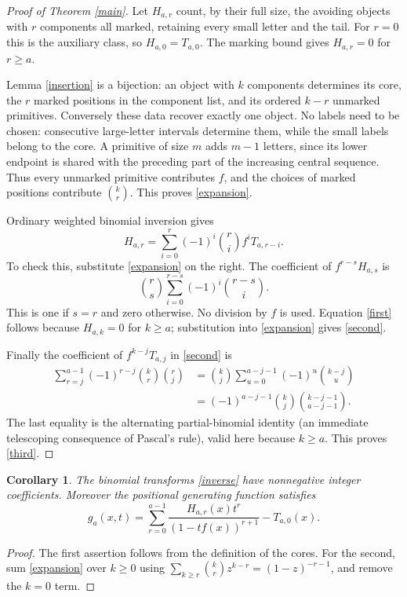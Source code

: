 \documentclass[11pt]{article}
\newtheorem{corollary}{Corollary}
\begin{document}
\begin{proof}[Proof of Theorem \ref{main}]
Let $H_{a,r}$ count, by their full size, the avoiding objects with
$r$ components all marked, retaining every small letter and the
tail. For $r=0$ this is the auxiliary class, so $H_{a,0}=T_{a,0}$.
The marking bound gives $H_{a,r}=0$ for $r\ge a$.

Lemma \ref{insertion} is a bijection: an object with $k$ components
determines its core, the $r$ marked positions in the component
list, and its ordered $k-r$ unmarked primitives. Conversely these
data recover exactly one object. No labels need to be chosen:
consecutive large-letter intervals determine them, while the
small labels belong to the core. A primitive of size $m$ adds
$m-1$ letters, since its lower endpoint is shared with the
preceding part of the increasing central sequence. Thus every
unmarked primitive contributes $f$, and the choices of marked
positions contribute $\binom{k}{r}$. This proves \eqref{expansion}.

Ordinary weighted binomial inversion gives
\begin{equation}\label{inverse}
 H_{a,r}=\sum_{i=0}^r(-1)^i\binom{r}{i}f^iT_{a,r-i}.
\end{equation}
To check this, substitute \eqref{expansion} on the right.
The coefficient of $f^{r-s}H_{a,s}$ is
\[
 \binom{r}{s}\sum_{i=0}^{r-s}(-1)^i\binom{r-s}{i}.
\]
This is one if $s=r$ and zero otherwise. No division by $f$ is used.
Equation \eqref{first} follows because $H_{a,k}=0$ for $k\ge a$;
substitution into \eqref{expansion} gives \eqref{second}.

Finally the coefficient of $f^{k-j}T_{a,j}$ in \eqref{second} is
\begin{align*}
 \sum_{r=j}^{a-1}(-1)^{r-j}\binom{k}{r}\binom{r}{j}
 &=\binom{k}{j}\sum_{u=0}^{a-j-1}(-1)^u\binom{k-j}{u}\\
 &=(-1)^{a-j-1}\binom{k}{j}\binom{k-j-1}{a-j-1}.
\end{align*}
The last equality is the alternating partial-binomial identity
(an immediate telescoping consequence of Pascal's rule), valid
here because $k\ge a$. This proves \eqref{third}.
\end{proof}

\begin{corollary}
The binomial transforms \eqref{inverse} have nonnegative integer
coefficients. Moreover the positional generating function satisfies
\[
 g_a(x,t)=\sum_{r=0}^{a-1}\frac{H_{a,r}(x)t^r}
                                  {(1-tf(x))^{r+1}}-T_{a,0}(x).
\]
\end{corollary}
\begin{proof}
The first assertion follows from the definition of the cores.
For the second, sum \eqref{expansion} over $k\ge0$ using
$\sum_{k\ge r}\binom{k}{r}z^{k-r}=(1-z)^{-r-1}$,
and remove the $k=0$ term.
\end{proof}
\end{document}
